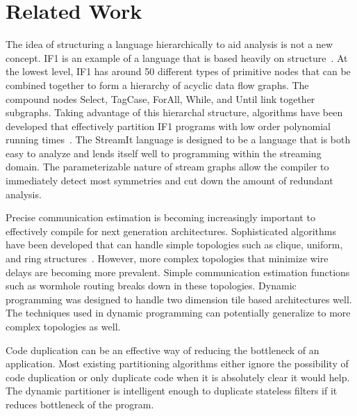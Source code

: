 \section{Related Work}







The idea of structuring a language hierarchically to aid analysis is
not a new concept. IF1 is an example of a language that is based
heavily on structure~\cite{Sked}. At the lowest level, IF1 has around
50 different types of primitive nodes that can be combined together to
form a hierarchy of acyclic data flow graphs. The compound nodes Select,
TagCase, ForAll, While, and Until link together subgraphs. Taking
advantage of this hierarchal structure, algorithms have been developed
that effectively partition IF1 programs with low order polynomial
running times~\cite{Sarker}. The StreamIt language is designed to be a
language that is both easy to analyze and lends itself well to
programming within the streaming domain. The parameterizable nature of
stream graphs allow the compiler to immediately detect most symmetries
and cut down the amount of redundant analysis.

Precise communication estimation is becoming increasingly important to
effectively compile for next generation architectures. Sophisticated
algorithms have been developed that can handle simple topologies such as
clique, uniform, and ring structures~\cite{Tao}. However, more complex
topologies that minimize wire delays are becoming more prevalent.
Simple communication estimation functions such as wormhole routing
breaks down in these topologies. Dynamic programming was designed to
handle two dimension tile based architectures well. The techniques
used in dynamic programming can potentially generalize to more complex
topologies as well.

Code duplication can be an effective way of reducing the bottleneck
of an application. Most existing partitioning algorithms either ignore
the possibility of code duplication or only duplicate code when it is
absolutely clear it would help. The dynamic partitioner is intelligent
enough to duplicate stateless filters if it reduces bottleneck
of the program.
